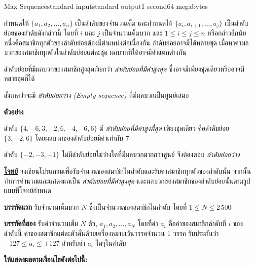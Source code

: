 \documentclass[11pt,a4paper]{article}
\begin{document}
\begin{problem}{Max Sequence}{standard input}{standard output}{1 second}{64 megabytes}

กำหนดให้ $\{a_1 , a_2 , … , a_n\}$ เป็นลำดับของจำนวนเต็ม และกำหนดให้ $\{a_i , a_{i+1} , … , a_j\}$ เป็นลำดับย่อยของลำดับดังกล่าวนี้ โดยที่ $i$ และ $j$ เป็นจำนวนเต็มบวก และ $1 \leq i \leq j \leq n$ หรือกล่าวอีกนัยหนึ่งคือสมาชิกทุกตัวของลำดับย่อยต้องมีตำแหน่งต่อเนื่องกัน ลำดับย่อยอาจมีได้หลายชุด เมื่อหาค่าผลบวกของสมาชิกทุกตัวในลำดับย่อยแต่ละชุด ผลบวกที่ได้อาจมีค่าแตกต่างกัน

ลำดับย่อยที่มีผลบวกของสมาชิกสูงสุดเรียกว่า \textit{ลำดับย่อยที่มีค่าสูงสุด} ซึ่งอาจมีเพียงชุดเดียวหรืออาจมีหลายชุดก็ได้

สังเกตว่าจะมี \textit{ลำดับย่อยว่าง (Empty sequence)} ที่มีผลบวกเป็นศูนย์เสมอ
\bigskip

\textbf{ตัวอย่าง}

ลำดับ $\{4, -6, 3, -2, 6, -4, -6, 6\}$ มี \textit{ลำดับย่อยที่มีค่าสูงที่สุด} เพียงชุดเดียว คือลำดับย่อย $\{3, -2, 6\}$ โดยผลบวกของลำดับย่อยมีค่าเท่ากับ $7$

ลำดับ $\{-2, -3, -1\}$ ไม่มีลำดับย่อยไม่ว่างใดที่มีผลบวกมากกว่าศูนย์ จึงต้องตอบ \textit{ลำดับย่อยว่าง}


\underline{\textbf{โจทย์}} จงเขียนโปรแกรมเพื่อรับจำนวนของสมาชิกในลำดับและรับค่าสมาชิกทุกตัวของลำดับนั้น จากนั้นทำการคำนวณและแสดงผลเป็น \textit{ลำดับย่อยที่มีค่าสูงสุด} และผลบวกของสมาชิกของลำดับย่อยนั้นตามรูปแบบที่โจทย์กำหนด


\InputFile
\textbf{บรรทัดแรก} รับจำนวนเต็มบวก $N$ ซึ่งเป็นจำนวนของสมาชิกในลำดับ โดยที่ $1 \leq N \leq 2\,500$ 

\textbf{บรรทัดที่สอง} รับค่าจำนวนเต็ม $N$ ตัว, $a_1,a_2,...,a_N$ โดยที่ค่า $a_i$ คือค่าของสมาชิกลำดับที่ $i$ ของลำดับนี้ ค่าของสมาชิกแต่ละตัวคั่นด้วยเครื่องหมายเว้นวรรคจำนวน $1$ วรรค รับประกันว่า $-127 \leq a_i \leq +127$ สำหรับค่า $a_i$ ใดๆในลำดับ


\OutputFile

\textbf{ให้แสดงผลตามเงื่อนไขดังต่อไปนี้:}
\begin{enumerate}


\end{enumerate}
\end{problem}
\end{document}
